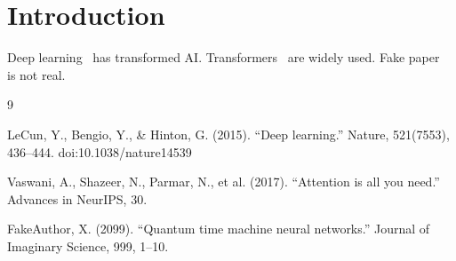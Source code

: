 \documentclass{article}
\begin{document}
\section{Introduction}
Deep learning~\cite{lecun2015deep} has transformed AI. 
Transformers~\cite{vaswani2017attention} are widely used.
Fake paper~\cite{fake2099timemachine} is not real.

\begin{thebibliography}{9}

LeCun, Y., Bengio, Y., \& Hinton, G. (2015). 
``Deep learning.'' Nature, 521(7553), 436--444.
doi:10.1038/nature14539

Vaswani, A., Shazeer, N., Parmar, N., et al. (2017). 
``Attention is all you need.'' Advances in NeurIPS, 30.

FakeAuthor, X. (2099). 
``Quantum time machine neural networks.'' 
Journal of Imaginary Science, 999, 1--10.

\end{thebibliography}
\end{document}
